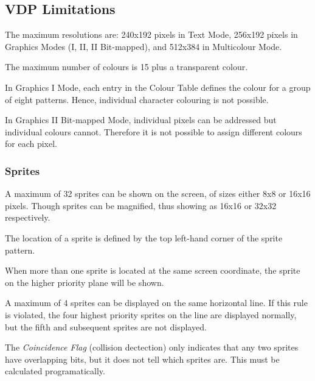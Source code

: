 \documentclass[a4paper,11pt]{article}
\begin{document}
    \subsection{VDP Limitations}

    The maximum resolutions are: 240x192 pixels in Text Mode, 256x192 pixels in
    Graphics Modes (I, II, II Bit-mapped), and 512x384 in Multicolour Mode.

    The maximum number of colours is 15 plus a transparent colour.

    In Graphics I Mode, each entry in the Colour Table defines the colour for
    a group of eight patterns. Hence, individual character colouring is not
    possible.
    
    In Graphics II Bit-mapped Mode, individual pixels can be addressed but
    individual colours cannot. Therefore it is not possible to assign different
    colours for each pixel.

    \subsubsection{Sprites}

    A maximum of 32 sprites can be shown on the screen, of sizes either 8x8 or
    16x16 pixels. Though sprites can be magnified, thus showing as 16x16 or
    32x32 respectively.

    The location of a sprite is defined by the top left-hand corner of the
    sprite pattern.

    When more than one sprite is located at the same screen coordinate, the
    sprite on the higher priority plane will be shown.

    A maximum of 4 sprites can be displayed on the same horizontal line. If this
    rule is violated, the four highest priority sprites on the line are
    displayed normally, but the fifth and subsequent sprites are not displayed.

    The \textit{Coincidence Flag} (collision dectection) only indicates that
    any two sprites have overlapping bits, but it does not tell which sprites
    are. This must be calculated programatically.

\end{document}
